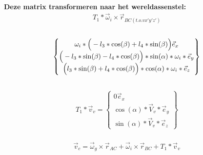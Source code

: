 \documentclass[a4paper,10pt]{article}
\begin{document}
\\
\textbf {Deze matrix transformeren naar het wereldassenstel:}\\
\begin{equation}
	\begin{aligned}
		{T}_{1}* \vec{\omega}_i \times \vec{r}_{BC(t.o.v x'y'z')}
	\end{aligned}
\end{equation}\\
\begin{equation}
	\begin{Bmatrix}
		{\omega_i*\Big( -l_3*\cos(\beta) + l_4 *\sin(\beta)\Big)\vec{e}_{x}}\\
		\Big(-l_3 * \sin(\beta)- l_4 * \cos(\beta)\Big)*\sin(\alpha) *\omega_i *\vec{e}_{y}\\
		\Big{(l_3 * \sin(\beta) + l_4 * \cos(\beta)\Big)*\cos(\alpha) *\omega_i*\vec{e}_{z}}
	\end{Bmatrix}
\end{equation}\\
\begin{equation}
	\begin{aligned}
		{T}_{1}* \vec{v}_v = \begin{Bmatrix}
			{0\vec{e}_{x}}\\
			\cos(\alpha)*\vec{V}_v*\vec{e}_{y}\\
			\sin(\alpha)*\vec{V}_v*\vec{e}_{z}
		\end{Bmatrix}
	\end{aligned}
\end{equation}\\
\begin{equation}
	\begin{aligned}
		\vec{v}_{c}=  \vec{\omega}_g \times \vec{r}_{AC} + \vec{\omega}_i \times \vec{r}_{BC} +{T}_{1}* \vec{v}_v
	\end{aligned}
\end{equation}\\
\end{document}
